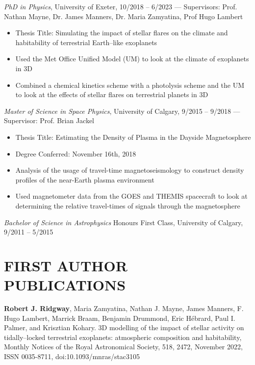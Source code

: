 \documentclass[letter, margin, 10pt]{res} %
\begin{document}
\begin{resume}
{\sl PhD in Physics}, University of Exeter, 10/2018 -- 6/2023 --- Supervisors: Prof. Nathan Mayne, Dr. James Manners, Dr. Maria Zamyatina, Prof Hugo Lambert\\
\begin{itemize}[noitemsep,topsep=0pt,parsep=0pt,partopsep=0pt]
\item Thesis Title: Simulating the impact of stellar flares on the climate and habitability of terrestrial Earth--like exoplanets
\item Used the Met Office Unified Model (UM) to look at the climate of exoplanets in 3D
\item Combined a chemical kinetics scheme with a photolysis scheme and the UM to look at the effects of stellar flares on terrestrial planets in 3D
\end{itemize}
\vspace{-10pt}
{\sl Master of Science in Space Physics}, University of Calgary, 9/2015 -- 9/2018 --- Supervisor: Prof. Brian Jackel
\begin{itemize}[noitemsep,topsep=0pt,parsep=0pt,partopsep=0pt]
\item Thesis Title: Estimating the Density of Plasma in the Dayside Magnetosphere
\item Degree Conferred: November 16th, 2018
\item Analysis of the usage of travel-time magnetoseismology to construct density profiles of the near-Earth plasma environment
\item Used magnetometer data from the GOES and THEMIS spacecraft to look at determining the relative travel-times of signals  through the magnetosphere
\end{itemize}
\vspace{-10pt}
{\sl Bachelor of Science in Astrophysics} Honours First Class, University of Calgary, 9/2011 -- 5/2015




\section{FIRST AUTHOR PUBLICATIONS}

\textbf{Robert J. Ridgway}, Maria Zamyatina, Nathan J. Mayne, James Manners, F. Hugo Lambert, Marrick Braam, Benjamin Drummond, Eric H\'{e}brard, Paul I. Palmer, and Krisztian Kohary. 3D modelling of the impact of stellar activity on tidally–locked terrestrial exoplanets: atmospheric composition and
habitability, Monthly Notices of the Royal Astronomical Society, 518, 2472, November 2022, ISSN 0035-8711, doi:10.1093/mnras/stac3105


\end{resume}
\end{document}
